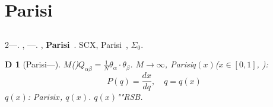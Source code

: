 \documentclass[12pt,a4paper]{article}
\newtheorem{definition}[theorem]Definition
\theoremstyle{remark}
\begin{document}
\section{Parisi}
\subsection{}
2\textbf{}---.
, \textbf{}---.
, \textbf{Parisi}~\cite{parisi1979,parisi1980,mezard1987}.
SCX, Parisi~\cite{scx_hamiltonian,scx_galois}, 
$\Sigma_0$.
\begin{definition}[Parisi---]
$M$()$Q_{\alpha\beta} = \frac{1}{N}\theta_\alpha \cdot \theta_\beta$.
$M \to \infty$, Parisi$q(x)$($x \in [0,1]$, ): 
\begin{equation}
    P(q) = \frac{dx}{dq}, \quad q = q(x)
\end{equation}
$q(x)$: Parisi$x$, $q(x)$.
$q(x)$""RSB.
\end{definition}
\end{document}
